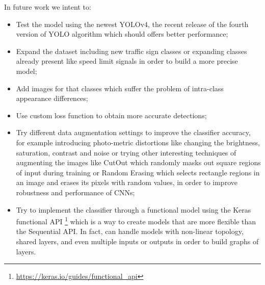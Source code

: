 \noindent In future work we intent to:
\begin{itemize}[noitemsep,topsep=0pt]
	\item Test the model using the newest YOLOv4, the recent release of the fourth version of YOLO algorithm which should offers better performance;
	\item Expand the dataset including new traffic sign classes or expanding classes already present like speed limit signals in order to build a more precise model;
	\item Add images for that classes which suffer the problem of intra-class appearance differences;
	\item Use custom loss function to obtain more accurate detections;
	\item Try different data augmentation settings to improve the classifier accuracy, for example introducing photo-metric distortions like changing the brightness, saturation, contrast and noise or trying other interesting techniques of augmenting the images like CutOut\cite{cutout} which randomly masks out square regions of input during training  or Random Erasing\cite{random} which selects rectangle regions in an image and erases its pixels with random values, in order to improve robustness and performance of CNNs;
	\item Try to implement the classifier through a functional model using the Keras functional API \footnote{\url{https://keras.io/guides/functional_api}}  which is a way to create models that are more flexible than the Sequential API. In fact, can handle models with non-linear topology, shared layers, and even multiple inputs or outputs in order to build graphs of layers.
\end{itemize}



